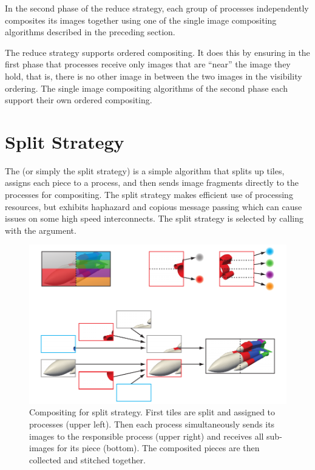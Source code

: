 In the second phase of the reduce strategy, each group of processes
independently composites its images together using one of the single image
compositing algorithms described in the preceding section.

The reduce strategy supports ordered compositing.  It does this by ensuring
in the first phase that processes receive only images that are ``near'' the
image they hold, that is, there is no other image in between the two images
in the visibility ordering.  The single image compositing algorithms of the
second phase each support their own ordered compositing.


\section{Split Strategy}
\label{sec:Strategies:Split}


The  (or simply the split
strategy) is a simple algorithm that splits up tiles, assigns each piece to
a process, and then sends image fragments directly to the processes for
compositing.  The split strategy makes efficient use of processing
resources, but exhibits haphazard and copious message passing which can
cause issues on some high speed interconnects.  The split strategy is
selected by calling  with the
 argument.

\begin{figure}
  \centering
  \includegraphics{images/TileSplit}
  \caption[Split strategy composite network.]{Compositing for split
    strategy.  First tiles are split and assigned to processes (upper
    left).  Then each process simultaneously sends its images to the
    responsible process (upper right) and receives all sub-images for its
    piece (bottom).  The composited pieces are then collected and stitched
    together.}
  \label{fig:TileSplit}
\end{figure}

